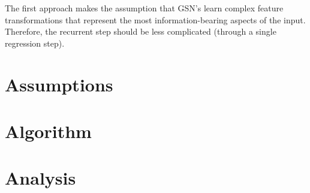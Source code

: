 The first approach makes the assumption that GSN's learn complex feature transformations that represent the most information-bearing aspects of the input. Therefore, the recurrent step should be less complicated (through a single regression step).

\section{Assumptions}

\section{Algorithm}

\section{Analysis}